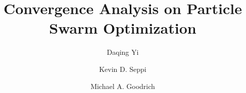 \documentclass{llncs}
\begin{document}
\title{Convergence Analysis on Particle Swarm Optimization}




\author{Daqing Yi \and Kevin D. Seppi \and Michael A. Goodrich}







\maketitle
\end{document}
